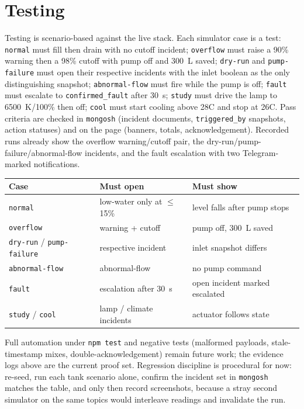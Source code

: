 \documentclass[11pt,a4paper]{article}
\begin{document}
\section{Testing}

Testing is scenario-based against the live stack. Each simulator case is a test: \texttt{normal} must fill then drain with no cutoff incident; \texttt{overflow} must raise a 90\% warning then a 98\% cutoff with pump off and 300~L saved; \texttt{dry-run} and \texttt{pump-failure} must open their respective incidents with the inlet boolean as the only distinguishing snapshot; \texttt{abnormal-flow} must fire while the pump is off; \texttt{fault} must escalate to \texttt{confirmed\_fault} after 30~s; \texttt{study} must drive the lamp to 6500~K/100\% then off; \texttt{cool} must start cooling above 28\textdegree C and stop at 26\textdegree C. Pass criteria are checked in \texttt{mongosh} (incident documents, \texttt{triggered\_by} snapshots, action statuses) and on the page (banners, totals, acknowledgement). Recorded runs already show the overflow warning/cutoff pair, the dry-run/pump-failure/abnormal-flow incidents, and the fault escalation with two Telegram-marked notifications.

\begin{center}
\small
\begin{tabularx}{\textwidth}{@{}lll@{}}
\toprule
Case & Must open & Must show \\
\midrule
\texttt{normal} & low-water only at $\le$15\% & level falls after pump stops \\
\texttt{overflow} & warning + cutoff & pump off, 300~L saved \\
\texttt{dry-run} / \texttt{pump-failure} & respective incident & inlet snapshot differs \\
\texttt{abnormal-flow} & abnormal-flow & no pump command \\
\texttt{fault} & escalation after 30~s & open incident marked escalated \\
\texttt{study} / \texttt{cool} & lamp / climate incidents & actuator follows state \\
\bottomrule
\end{tabularx}
\end{center}

Full automation under \texttt{npm test} and negative tests (malformed payloads, stale-timestamp mixes, double-acknowledgement) remain future work; the evidence logs above are the current proof set. Regression discipline is procedural for now: re-seed, run each tank scenario alone, confirm the incident set in \texttt{mongosh} matches the table, and only then record screenshots, because a stray second simulator on the same topics would interleave readings and invalidate the run.
\end{document}
